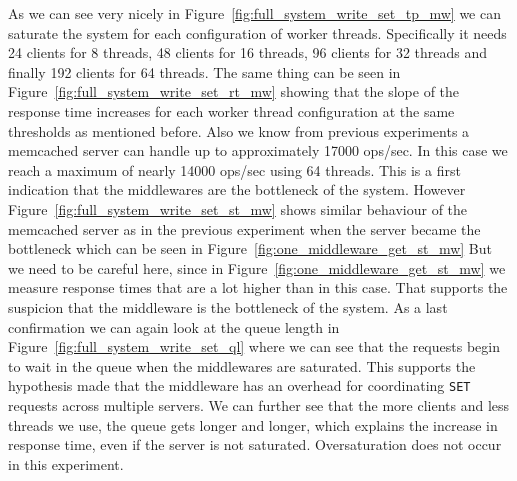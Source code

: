\documentclass[11pt,a4paper]{article}
\begin{document}
%
As we can see very nicely in Figure~\ref{fig:full_system_write_set_tp_mw} we can saturate the system for each configuration of worker threads.
%
Specifically it needs 24 clients for 8 threads, 48 clients for 16 threads, 96 clients for 32 threads and finally 192 clients for 64 threads.
%
The same thing can be seen in Figure~\ref{fig:full_system_write_set_rt_mw} showing that the slope of the response time increases for each worker thread configuration at the same thresholds as mentioned before.
%
Also we know from previous experiments a memcached server can handle up to approximately 17000 ops/sec.
%
In this case we reach a maximum of nearly 14000 ops/sec using 64 threads.
%
This is a first indication that the middlewares are the bottleneck of the system.
%
However Figure~\ref{fig:full_system_write_set_st_mw} shows similar behaviour of the memcached server as in the previous experiment when the server became the bottleneck which can be seen in Figure~\ref{fig:one_middleware_get_st_mw}
%
But we need to be careful here, since in Figure~\ref{fig:one_middleware_get_st_mw} we measure response times that are a lot higher than in this case.
%
That supports the suspicion that the middleware is the bottleneck of the system.
%
As a last confirmation we can again look at the queue length in Figure~\ref{fig:full_system_write_set_ql} where we can see that the requests begin to wait in the queue when the middlewares are saturated.
%
This supports the hypothesis made that the middleware has an overhead for coordinating \texttt{SET} requests across multiple servers.
%
We can further see that the more clients and less threads we use, the queue gets longer and longer, which explains the increase in response time, even if the server is not saturated.
%
Oversaturation does not occur in this experiment.
%
\end{document}

